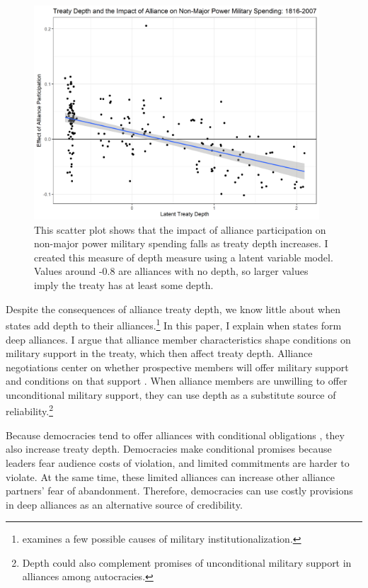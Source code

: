 \documentclass[12pt]{article}
\begin{document}
\begin{figure}[hbtp]
\centering
\includegraphics[width=0.95\textwidth]{../figures/depth-motive.png}
\caption{This scatter plot shows that the impact of alliance participation on non-major power military spending falls as treaty depth increases. I created this measure of depth measure using a latent variable model. Values around -0.8 are alliances with no depth, so larger values imply the treaty has at least some depth.}
\label{fig:depth-motive}
\end{figure}


Despite the consequences of alliance treaty depth, we know little about when states add depth to their alliances.\footnote{\citet{Mattes2012} examines a few possible causes of military institutionalization.}
In this paper, I explain when states form deep alliances.
I argue that alliance member characteristics shape conditions on military support in the treaty, which then affect treaty depth. 
Alliance negotiations center on whether prospective members will offer military support and conditions on that support \citep{Poast2019a}. 
When alliance members are unwilling to offer unconditional military support, they can use depth as a substitute source of reliability.\footnote{Depth could also complement promises of unconditional military support in alliances among autocracies.}


Because democracies tend to offer alliances with conditional obligations \citep{Mattes2012, Chibaetal2015}, they also increase treaty depth. 
Democracies make conditional promises because leaders fear audience costs of violation, and limited commitments are harder to violate.
At the same time, these limited alliances can increase other alliance partners' fear of abandonment. 
Therefore, democracies can use costly provisions in deep alliances as an alternative source of credibility.   
\end{document}
